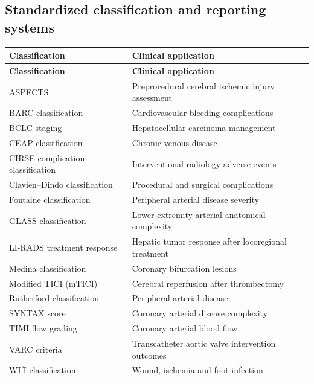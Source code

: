 \subsection{Standardized classification and reporting systems}
\begin{longtable}{@{}p{}p{}@{}}
\toprule
\textbf{Classification} & \textbf{Clinical application} \\
\midrule
\endfirsthead
\toprule
\textbf{Classification} & \textbf{Clinical application} \\
\midrule
\endhead
ASPECTS & Preprocedural cerebral ischemic injury assessment \\
BARC classification & Cardiovascular bleeding complications \\
BCLC staging & Hepatocellular carcinoma management \\
CEAP classification & Chronic venous disease \\
CIRSE complication classification & Interventional radiology adverse events \\
Clavien--Dindo classification & Procedural and surgical complications \\
Fontaine classification & Peripheral arterial disease severity \\
GLASS classification & Lower-extremity arterial anatomical complexity \\
LI-RADS treatment response & Hepatic tumor response after locoregional treatment \\
Medina classification & Coronary bifurcation lesions \\
Modified TICI (mTICI) & Cerebral reperfusion after thrombectomy \\
Rutherford classification & Peripheral arterial disease \\
SYNTAX score & Coronary arterial disease complexity \\
TIMI flow grading & Coronary arterial blood flow \\
VARC criteria & Transcatheter aortic valve intervention outcomes \\
WIfI classification & Wound, ischemia and foot infection \\
\bottomrule
\end{longtable}

